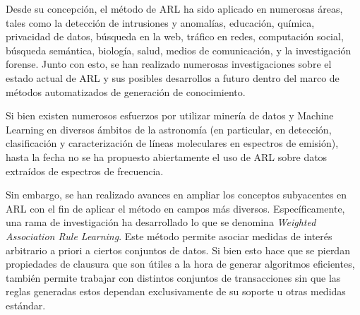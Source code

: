 Desde su concepción, el método de ARL ha sido aplicado en numerosas áreas, tales como la detección de intrusiones\cite{lee2000framework} y anomalías\cite{patcha2007overview}\cite{chandola2009anomaly}, educación\cite{romero2007educational}\cite{romero2008data}, química\cite{dehaspe1998finding}, privacidad de datos\cite{ghinita2008private}, búsqueda en la web\cite{ferragina2008personalized}, tráfico en redes\cite{estan2003automatically}, computación social\cite{li2008tag}, búsqueda semántica\cite{cohen2007associative}, biología\cite{kramer2001molecular}\cite{carmona2007genecodis}, salud\cite{karabatak2009expert}\cite{chaves2011efficient}, medios de comunicación\cite{davidson2010youtube}\cite{kobilarov2009media}, y la investigación forense\cite{iqbal2013unified}. Junto con esto, se han realizado numerosas investigaciones sobre el estado actual de ARL y sus posibles desarrollos a futuro dentro del marco de métodos automatizados de generación de conocimiento\cite{han2007frequent}.

Si bien existen numerosos esfuerzos por utilizar minería de datos y Machine Learning en diversos ámbitos de la astronomía (en particular, en detección, clasificación y caracterización de líneas moleculares en espectros de emisión\cite{vskoda2011searching}), hasta la fecha no se ha propuesto abiertamente el uso de ARL sobre datos extraídos de espectros de frecuencia.

Sin embargo, se han realizado avances en ampliar los conceptos subyacentes en ARL con el fin de aplicar el método en campos más diversos\cite{brin1997beyond}. Específicamente, una rama de investigación ha desarrollado lo que se denomina \textit{Weighted Association Rule Learning}\cite{wang2000efficient}\cite{cai1998mining}. Este método permite asociar medidas de interés arbitrario a priori a ciertos conjuntos de datos. Si bien esto hace que se pierdan propiedades de clausura que son útiles a la hora de generar algoritmos eficientes, también permite trabajar con distintos conjuntos de transacciones sin que las reglas generadas estos dependan exclusivamente de su soporte u otras medidas estándar.

